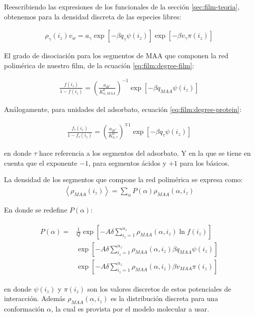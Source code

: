 Reescribiendo las expresiones de los funcionales de la secci\'on \ref{sec:film-teoria}, obtenemos para la densidad discreta de las especies libres:

\begin{align}
	\rho_\gamma(i_z)v_w = a_\gamma \exp\left[-\beta q_\gamma\psi(i_z)\right] \exp\left[-\beta v_\gamma\pi(i_z)\right]
\end{align}


El grado de disociaci\'on para los segmentos de MAA que componen la red polim\'erica de nuestro film, de la ecuaci\'on \ref{eq:film:degree-film}:

\begin{align}
	\frac{f(i_z)}{1-f(i_z)} = \left(\frac{a_{H^+}}{K^0_{a,MAA}}\right)^{- 1} \exp[-\beta q_{MAA} \psi(i_z)]
\end{align}

An\'alogamente, para unidades del adsorbato, ecuaci\'on \ref{eq:film:degree-protein}:

\begin{align}
	\frac{f_\tau(i_z)}{1-f_\tau(i_z)} = \left(\frac{a_{H^+}}{K^0_{a,\tau}}\right)^{\mp 1} \exp[-\beta q_\tau \psi(i_z)]
\end{align}

\noindent en donde $\tau$ hace referencia a los segmentos del adsorbato. Y en la que se tiene en cuenta que el exponente $-1$, para segmentos \'acidos y  $+1$ para los b\'asicos.

La densidad de los segmentos que compone la red polim\'erica se expresa como:
\begin{align}
	\left< \rho_{MAA}(i_z)\right> = \sum_\alpha P(\alpha)\rho_{MAA}(\alpha, i_z)
\end{align}

En donde se redefine $P(\alpha)$:


\begin{align}
	\begin{aligned}
		P(\alpha) = &\frac{1}{Q}\exp\left[ -A \delta \sum^{n_z}_{i_z = 1} \rho_{MAA}(\alpha, i_z) \ln f(i_z)\right] \\
		&\exp\left[ -A\delta \sum^{n_z}_{i_z = 1}  \rho_{MAA}(\alpha, i_z) \beta q_{MAA} \psi(i_z)\right] \\
		& \exp\left[ -A\delta \sum^{n_z}_{i_z = 1}  \rho_{MAA}(\alpha, i_z) \beta v_{MAA} \pi(i_z)\right] 
	\end{aligned}
\end{align}

\noindent en donde $\psi(i_z)$ y $\pi(i_z)$ son los valores discretos de estos potenciales de interacci\'on. Adem\'as $\rho_{MAA}(\alpha, i_z)$ es la distribuci\'on discreta para una conformaci\'on $\alpha$, la cual es provista por el modelo molecular a usar.

